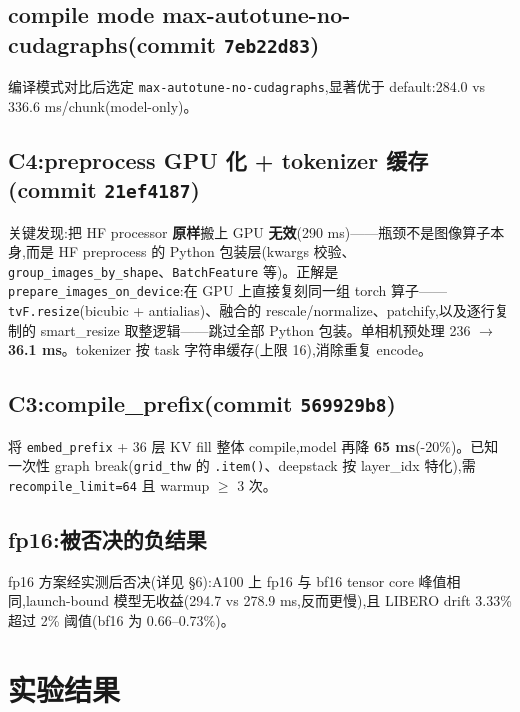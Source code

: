 \documentclass[11pt]{ctexart}
\begin{document}
\subsection{compile mode max-autotune-no-cudagraphs(commit \texttt{7eb22d83})}
编译模式对比后选定 \texttt{max-autotune-no-cudagraphs},显著优于 default:284.0 vs 336.6 ms/chunk(model-only)。

\subsection{C4:preprocess GPU 化 + tokenizer 缓存(commit \texttt{21ef4187})}
关键发现:把 HF processor \textbf{原样}搬上 GPU \textbf{无效}(290 ms)——瓶颈不是图像算子本身,而是 HF preprocess 的 Python 包装层(kwargs 校验、\texttt{group\_images\_by\_shape}、\texttt{BatchFeature} 等)。正解是 \texttt{prepare\_images\_on\_device}:在 GPU 上直接复刻同一组 torch 算子——\texttt{tvF.resize}(bicubic + antialias)、融合的 rescale/normalize、patchify,以及逐行复制的 smart\_resize 取整逻辑——跳过全部 Python 包装。单相机预处理 236 $\to$ \textbf{36.1 ms}。tokenizer 按 task 字符串缓存(上限 16),消除重复 encode。

\subsection{C3:compile\_prefix(commit \texttt{569929b8})}
将 \texttt{embed\_prefix} + 36 层 KV fill 整体 compile,model 再降 \textbf{65 ms}(-20\%)。已知一次性 graph break(\texttt{grid\_thw} 的 \texttt{.item()}、deepstack 按 layer\_idx 特化),需 \texttt{recompile\_limit=64} 且 warmup $\ge$ 3 次。

\subsection{fp16:被否决的负结果}
fp16 方案经实测后否决(详见 \S 6):A100 上 fp16 与 bf16 tensor core 峰值相同,launch-bound 模型无收益(294.7 vs 278.9 ms,反而更慢),且 LIBERO drift 3.33\% 超过 2\% 阈值(bf16 为 0.66--0.73\%)。

\section{实验结果}
\end{document}
